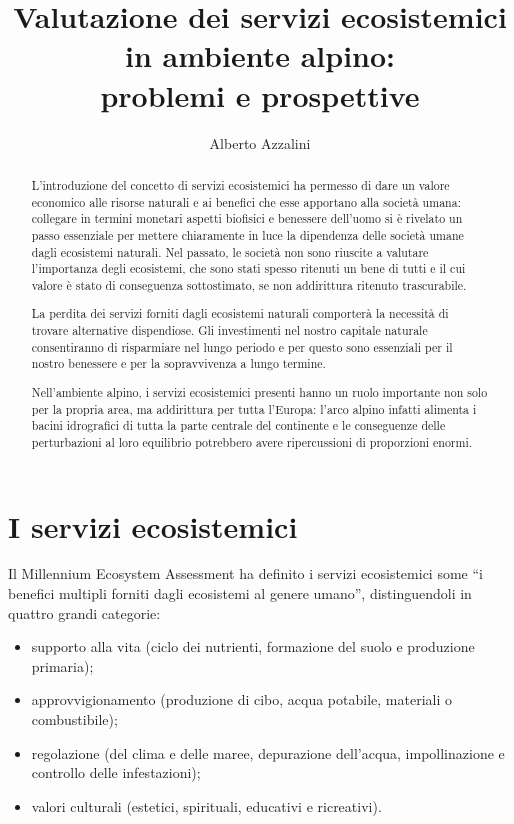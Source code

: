 \documentclass[11pt,a4paper]{article}
\author{Alberto Azzalini}
\title{Valutazione dei servizi ecosistemici in ambiente alpino:\\ problemi e prospettive}
\begin{document}
	\maketitle
	\begin{abstract}
		L'introduzione del concetto di servizi ecosistemici ha permesso di dare un valore economico alle risorse naturali e ai benefici che esse apportano alla società umana: collegare in termini monetari aspetti biofisici e benessere dell'uomo si è rivelato un passo essenziale per mettere chiaramente in luce la dipendenza delle società umane dagli ecosistemi naturali.
		Nel passato, le società non sono riuscite a valutare l'importanza degli ecosistemi, che sono stati spesso ritenuti un bene di tutti e il cui valore è stato di conseguenza sottostimato, se non addirittura ritenuto trascurabile.
		
		La perdita dei servizi forniti dagli ecosistemi naturali comporterà la necessità di trovare alternative dispendiose. Gli investimenti nel nostro capitale naturale consentiranno di risparmiare nel lungo periodo e per questo sono essenziali per il nostro benessere e per la sopravvivenza a lungo termine. \cite{Ecosystem_goods_and_services}
		
		Nell'ambiente alpino, i servizi ecosistemici presenti hanno un ruolo importante non solo per la propria area, ma addirittura per tutta l'Europa: l'arco alpino infatti alimenta i bacini idrografici di tutta la parte centrale del continente e le conseguenze delle perturbazioni al loro equilibrio potrebbero avere ripercussioni di proporzioni enormi.
		
		
	\end{abstract}
	
	\section{I servizi ecosistemici}
	Il Millennium Ecosystem Assessment\cite{MEA_EcosystemsAndHumanWellBeing:Synthesis} ha definito i servizi ecosistemici some ``i benefici multipli forniti dagli ecosistemi al genere umano'', distinguendoli in quattro grandi categorie:
	\begin{itemize}
		\item supporto alla vita (ciclo dei nutrienti, formazione del suolo e produzione primaria);
		\item approvvigionamento (produzione di cibo, acqua potabile, materiali o combustibile);
		\item regolazione (del clima e delle maree, depurazione dell'acqua, impollinazione e controllo delle infestazioni);
		\item valori culturali (estetici, spirituali, educativi e ricreativi).
		
	\end{itemize}
	
\end{document}
